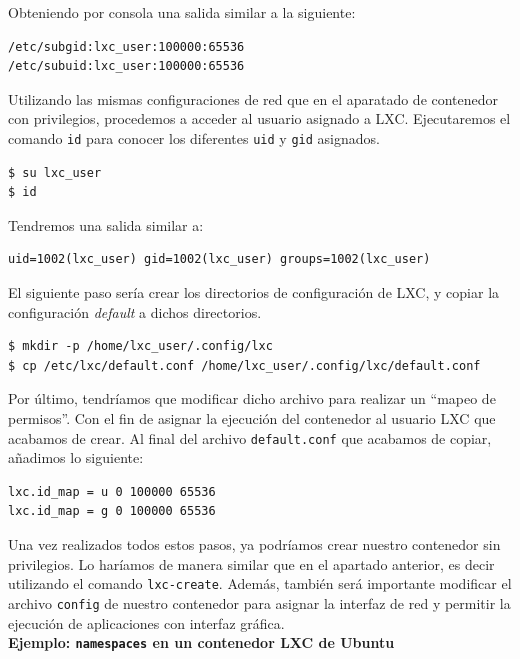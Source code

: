 \documentclass[a4paper, oneside, 12pt]{book}
\begin{document}
	\noindent Obteniendo por consola una salida similar a la siguiente:
	\begin{verbatim}
/etc/subgid:lxc_user:100000:65536
/etc/subuid:lxc_user:100000:65536
	\end{verbatim}
	
	\noindent Utilizando las mismas configuraciones de red que en el aparatado de contenedor con privilegios, procedemos a acceder al usuario asignado a LXC. Ejecutaremos el comando \texttt{id} para conocer los diferentes \texttt{uid} y \texttt{gid} asignados.
	\begin{verbatim}
$ su lxc_user
$ id
	\end{verbatim}

	\noindent Tendremos una salida similar a:
	\begin{verbatim}
uid=1002(lxc_user) gid=1002(lxc_user) groups=1002(lxc_user)
	\end{verbatim}

	\noindent El siguiente paso sería crear los directorios de configuración de LXC, y copiar la configuración \textit{default} a dichos directorios.
	\begin{verbatim}
$ mkdir -p /home/lxc_user/.config/lxc
$ cp /etc/lxc/default.conf /home/lxc_user/.config/lxc/default.conf
	\end{verbatim}

	\noindent Por último, tendríamos que modificar dicho archivo para realizar un ``mapeo de permisos''. Con el fin de asignar la ejecución del contenedor al usuario LXC que acabamos de crear. Al final del archivo \texttt{default.conf} que acabamos de copiar, añadimos lo siguiente:
	\begin{lstlisting}[language=Bash, caption={Configuración para mapear UID y GID para un contenedor sin privilegios en LXC}]
lxc.id_map = u 0 100000 65536
lxc.id_map = g 0 100000 65536
	\end{lstlisting}

	\noindent Una vez realizados todos estos pasos, ya podríamos crear nuestro contenedor sin privilegios. Lo haríamos de manera similar que en el apartado anterior, es decir utilizando el comando \texttt{lxc-create}. Además, también será importante modificar el archivo \texttt{config} de nuestro contenedor para asignar la interfaz de red y permitir la ejecución de aplicaciones con interfaz gráfica. \\
	
	\noindent \textbf{\large Ejemplo: \texttt{namespaces} en un contenedor LXC de Ubuntu}\\
	
\end{document}
